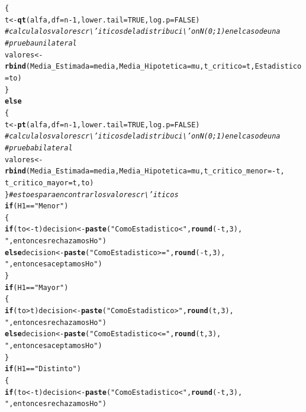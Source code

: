 \documentclass[12pt,letterpaper]{article}\usepackage[]{graphicx}\usepackage[]{color}
\makeatletter
\newcommand{\hlnum}[1]{\textcolor[rgb]{0.686,0.059,0.569}{#1}}%
\newcommand{\hlstr}[1]{\textcolor[rgb]{0.192,0.494,0.8}{#1}}%
\newcommand{\hlcom}[1]{\textcolor[rgb]{0.678,0.584,0.686}{\textit{#1}}}%
\newcommand{\hlopt}[1]{\textcolor[rgb]{0,0,0}{#1}}%
\newcommand{\hlstd}[1]{\textcolor[rgb]{0.345,0.345,0.345}{#1}}%
\newcommand{\hlkwa}[1]{\textcolor[rgb]{0.161,0.373,0.58}{\textbf{#1}}}%
\newcommand{\hlkwb}[1]{\textcolor[rgb]{0.69,0.353,0.396}{#1}}%
\newcommand{\hlkwc}[1]{\textcolor[rgb]{0.333,0.667,0.333}{#1}}%
\newcommand{\hlkwd}[1]{\textcolor[rgb]{0.737,0.353,0.396}{\textbf{#1}}}%
\newenvironment{kframe}{%
 \def\at@end@of@kframe{}%
 \ifinner\ifhmode%
  \def\at@end@of@kframe{\end{minipage}}%
  \begin{minipage}{\columnwidth}%
 \fi\fi%
 \def\FrameCommand##1{\hskip\@totalleftmargin \hskip-\fboxsep
 \colorbox{shadecolor}{##1}\hskip-\fboxsep
     \hskip-\linewidth \hskip-\@totalleftmargin \hskip\columnwidth}%
 \MakeFramed {\advance\hsize-\width
   \@totalleftmargin\z@ \linewidth\hsize
   \@setminipage}}%
 {\par\unskip\endMakeFramed%
 \at@end@of@kframe}
\newenvironment{knitrout}{}{} %
\makeatother
\begin{document}
\begin{knitrout}
\begin{kframe}
\begin{alltt}
\hlstd{\{}
  \hlstd{t} \hlkwb{<-} \hlkwd{qt}\hlstd{(alfa,} \hlkwc{df}\hlstd{=n}\hlopt{-}\hlnum{1}\hlstd{,} \hlkwc{lower.tail} \hlstd{=} \hlnum{TRUE}\hlstd{,} \hlkwc{log.p} \hlstd{=} \hlnum{FALSE}\hlstd{)}
  \hlcom{# calcula los valores cr\textbackslash{}'iticos de la distribuci\textbackslash{}'on N(0;1) en el caso de una }
\hlcom{# prueba unilateral }
\hlstd{valores} \hlkwb{<-} \hlkwd{rbind}\hlstd{(}\hlkwc{Media_Estimada}\hlstd{=media,} \hlkwc{Media_Hipotetica}\hlstd{=mu,} \hlkwc{t_critico}\hlstd{=t,}\hlkwc{Estadistico}\hlstd{= to)}
\hlstd{\}}
\hlkwa{else}
\hlstd{\{}
\hlstd{t} \hlkwb{<-} \hlkwd{pt}\hlstd{(alfa,} \hlkwc{df}\hlstd{=n}\hlopt{-}\hlnum{1}\hlstd{,} \hlkwc{lower.tail} \hlstd{=} \hlnum{TRUE}\hlstd{,} \hlkwc{log.p} \hlstd{=} \hlnum{FALSE}\hlstd{)}
\hlcom{# calcula los valores cr\textbackslash{}'iticos de la distribuci\textbackslash{}'on N(0;1) en el caso de una }
\hlcom{# prueba  bilateral }
\hlstd{valores} \hlkwb{<-} \hlkwd{rbind}\hlstd{(}\hlkwc{Media_Estimada}\hlstd{=media,} \hlkwc{Media_Hipotetica}\hlstd{=mu,} \hlkwc{t_critico_menor}\hlstd{=}\hlopt{-}\hlstd{t,}
\hlkwc{t_critico_mayor} \hlstd{=t, to)}
\hlstd{\}} \hlcom{# esto es para encontrar los valores cr\textbackslash{}'iticos }
\hlkwa{if} \hlstd{(H1} \hlopt{==} \hlstr{"Menor"}\hlstd{)}
\hlstd{\{}
 \hlkwa{if} \hlstd{(to} \hlopt{< -}\hlstd{t) decision} \hlkwb{<-} \hlkwd{paste}\hlstd{(}\hlstr{"Como Estadistico <"}\hlstd{,} \hlkwd{round}\hlstd{(}\hlopt{-}\hlstd{t,}\hlnum{3}\hlstd{),}
                                \hlstr{", entonces rechazamos Ho"}\hlstd{)}
 \hlkwa{else} \hlstd{decision} \hlkwb{<-} \hlkwd{paste}\hlstd{(}\hlstr{"Como Estadistico>="}\hlstd{,} \hlkwd{round}\hlstd{(}\hlopt{-}\hlstd{t,}\hlnum{3}\hlstd{),}
                        \hlstr{", entonces aceptamos Ho"}\hlstd{)}
\hlstd{\}}
\hlkwa{if} \hlstd{(H1} \hlopt{==} \hlstr{"Mayor"}\hlstd{)}
\hlstd{\{}
\hlkwa{if} \hlstd{(to} \hlopt{>} \hlstd{t) decision} \hlkwb{<-} \hlkwd{paste}\hlstd{(}\hlstr{"Como Estadistico >"}\hlstd{,} \hlkwd{round}\hlstd{(t,}\hlnum{3}\hlstd{),}
                              \hlstr{", entonces rechazamos Ho"}\hlstd{)}
\hlkwa{else} \hlstd{decision} \hlkwb{<-} \hlkwd{paste}\hlstd{(}\hlstr{"Como Estadistico <="}\hlstd{,} \hlkwd{round}\hlstd{(t,}\hlnum{3}\hlstd{),}
                       \hlstr{", entonces aceptamos Ho"}\hlstd{)}
\hlstd{\}}
\hlkwa{if} \hlstd{(H1} \hlopt{==} \hlstr{"Distinto"}\hlstd{)}
\hlstd{\{}
 \hlkwa{if} \hlstd{(to} \hlopt{< -}\hlstd{t) decision} \hlkwb{<-} \hlkwd{paste}\hlstd{(}\hlstr{"Como Estadistico <"}\hlstd{,} \hlkwd{round}\hlstd{(}\hlopt{-}\hlstd{t,}\hlnum{3}\hlstd{),}
                                \hlstr{", entonces rechazamos Ho"}\hlstd{)}

\end{alltt}
\end{kframe}
\end{knitrout}
\end{document}
